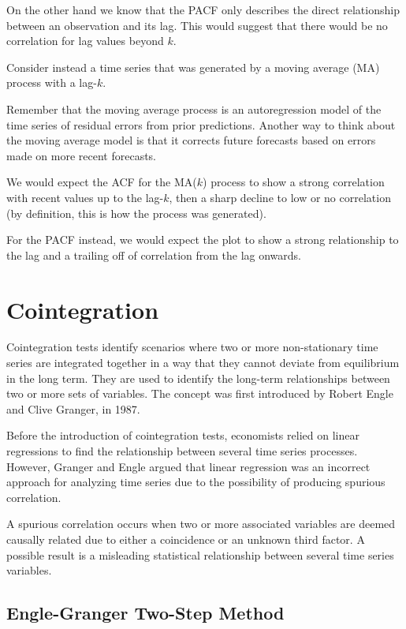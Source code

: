 On the other hand we know that the PACF only describes the direct relationship between an observation and its lag. This would suggest that there would be no correlation for lag values beyond \(k\).

Consider instead a time series that was generated by a moving average (MA) process with a lag-\(k\).

Remember that the moving average process is an autoregression model of the time series of residual errors from prior predictions. Another way to think about the moving average model is that it corrects future forecasts based on errors made on more recent forecasts.

We would expect the ACF for the MA(\(k\)) process to show a strong correlation with recent values up to the lag-\(k\), then a sharp decline to low or no correlation (by definition, this is how the process was generated).

For the PACF instead, we would expect the plot to show a strong relationship to the lag and a trailing off of correlation from the lag onwards.

\section{Cointegration}\label{cointegration}

Cointegration tests identify scenarios where two or more non-stationary time series are integrated together in a way that they cannot deviate from equilibrium in the long term. They are used to identify the long-term relationships between two or more sets of variables. The concept was first introduced by Robert Engle and Clive Granger, in 1987.

Before the introduction of cointegration tests, economists relied on linear regressions to find the relationship between several time series processes. However, Granger and Engle argued that linear regression was an incorrect approach for analyzing time series due to the possibility of producing spurious correlation.

A spurious correlation occurs when two or more associated variables are deemed causally related due to either a coincidence or an unknown third factor. A possible result is a misleading statistical relationship between several time series variables.

\subsection{Engle-Granger Two-Step Method}
\label{engle-granger-two-step-method}

